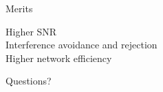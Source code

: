 \documentclass[10pt]{beamer}
\begin{document}
\begin{frame}{Merits}
	\begin{description}
		\item [Higher SNR] 
		\item [Interference avoidance and rejection] 
		\item [Higher network efficiency] 
	\end{description}
\end{frame}

{
\begin{frame}[standout]
  Questions?
\end{frame}
}
\end{document}
